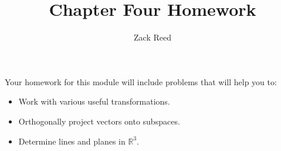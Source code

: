 \documentclass{ximera}
\author{Zack Reed}
\title{Chapter Four Homework}
\begin{document}
 
\begin{abstract}
\end{abstract}
 
\maketitle
 
Your homework for this module will include problems that will help you to:
 
\begin{itemize}
\item Work with various useful transformations.
\item Orthogonally project vectors onto subspaces.
\item Determine lines and planes in $\mathbb{R}^3$.
\end{itemize}
 
 
\end{document}
